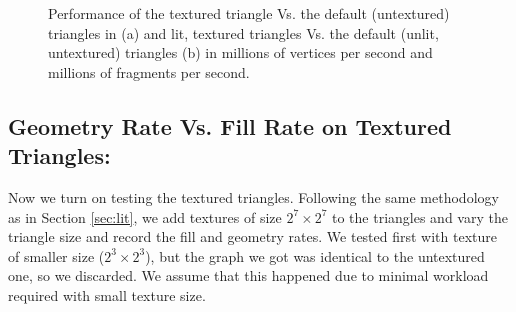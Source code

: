 \begin{figure}[!tbh]
 \centering  
  \caption{Performance of the textured triangle Vs. the default (untextured) triangles in \protect{\wes} (a) and lit, textured triangles Vs. the default (unlit, untextured) triangles (b) in millions of vertices per second and millions of fragments per second.}
   \label{fig:fill_geo2}
\end{figure} 

\subsection{Geometry Rate Vs. Fill Rate on Textured Triangles:}\label{sec:tx}
Now we turn on testing the textured triangles. Following the same methodology as in Section \ref{sec:lit}, we add textures of size $2^{7}\times2^{7}$ to the triangles and vary the triangle size and record the fill and geometry rates. We tested first with texture of smaller size ($2^{3}\times2^{3}$), but the graph we got was identical to the untextured one, so we discarded. We assume that this happened due to minimal workload required with small texture size. 

